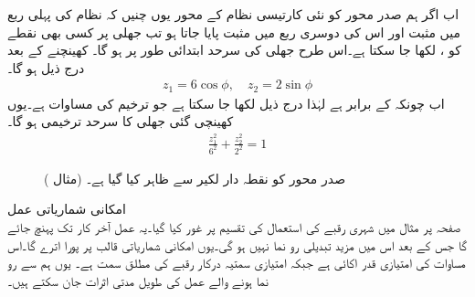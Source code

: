 اب اگر ہم صدر محور کو نئی کارتیسی نظام  کے محور یوں چنیں کہ  نظام کی پہلی ربع میں مثبت  اور اس کی دوسری ربع میں مثبت  پایا جاتا ہو تب جھلی پر کسی بھی نقطے کو ،  لکھا جا سکتا ہے۔اس طرح جھلی کی سرحد ابتدائی طور پر  ہو گا۔ کھینچنے کے بعد درج ذیل ہو گا۔
\begin{align*}
z_1=6\cos \phi,\quad z_2=2\sin \phi
\end{align*} 
اب چونکہ  کے برابر ہے لہٰذا درج ذیل لکھا جا سکتا ہے جو ترخیم کی مساوات ہے۔یوں کھینچی گئی جھلی کا سرحد ترخیمی ہو گا۔
\begin{align*}
\frac{z_1^2}{6^2}+\frac{z_2^2}{2^2}=1
\end{align*}
%
\begin{figure}
\centering
{}
\caption{صدر محور کو نقطہ دار لکیر سے ظاہر کیا گیا ہے۔ (مثال )}
\label{شکل_مثال_امتیازی_جھلی_صدر_محور}
\end{figure}
\quad امکانی شماریاتی عمل\\
صفحہ  پر مثال  میں  شہری رقبے کی استعمال کی تقسیم پر غور کیا گیا۔یہ عمل آخر کار   تک پہنچ جائے گا جس کے بعد اس میں مزید تبدیلی رو نما نہیں ہو گی۔یوں امکانی شماریاتی قالب  پر پورا اترے گا۔اس مساوات کی امتیازی قدر اکائی ہے جبکہ امتیازی سمتیہ  درکار رقبے کی مطلق سمت ہے۔ یوں ہم   سے رو نما ہونے والے عمل کی طویل مدتی اثرات جان سکتے ہیں۔ 

